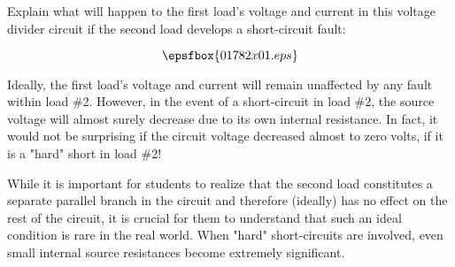 

Explain what will happen to the first load's voltage and current in this voltage divider circuit if the second load develops a short-circuit fault:

$$\epsfbox{01782x01.eps}$$







Ideally, the first load's voltage and current will remain unaffected by any fault within load \#2.  However, in the event of a short-circuit in load \#2, the source voltage will almost surely decrease due to its own internal resistance.  In fact, it would not be surprising if the circuit voltage decreased almost to zero volts, if it is a "hard" short in load \#2!







While it is important for students to realize that the second load constitutes a separate parallel branch in the circuit and therefore (ideally) has no effect on the rest of the circuit, it is crucial for them to understand that such an ideal condition is rare in the real world.  When "hard" short-circuits are involved, even small internal source resistances become extremely significant.




